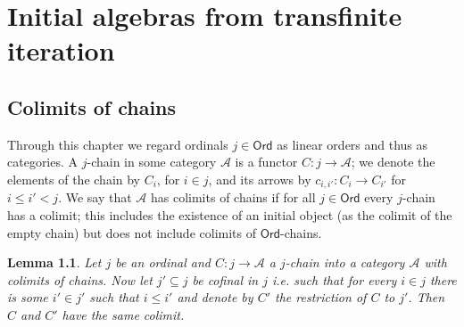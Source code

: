 \documentclass[letterpaper, 11pt, oneside]{memoir}
\theoremstyle{myteo}
\newtheorem{lemma}[theorem]{Lemma}
\numberwithin{equation}{section}
\newcommand{\marginnote}[1]{\marginpar{\footnotesize #1}}
\newcommand{\Ord}{\textsf{Ord}}
\newcommand{\A}{\mathscr{A}}
\begin{document}
\chapter{Initial algebras from transfinite iteration}
\label{ch:algebras-transfinite-iteration}
\newpage

\section{Colimits of chains}
\label{sec:colimits_of_chains}

Through this chapter we regard ordinals \(j \in \Ord\) as linear orders and thus as categories.
A \(j\)-chain in some category \(\A\) is a functor \(C : j \to \A \)\marginnote{\(j\)-chain}; we denote the elements of the chain by \(C_i\), for \(i \in j\), and its arrows by \(c_{i,i'} : C_i \to C_{i'}\) for \(i \leq i' < j\).
We say that \(\A\) has colimits of chains if for all \(j \in \Ord\) every \(j\)-chain has a colimit; this includes the existence of an initial object (as the colimit of the empty chain) but does not include colimits of \(\Ord\)-chains.

\begin{lemma}
  \label{lemma:final_functors}
  Let \(j\) be an ordinal and \(C : j \to \A\) a \(j\)-chain into a category \(\A\) with colimits of chains.
  Now let \(j' \subseteq j\) be cofinal in \(j\) i.e. such that for every \(i \in j\) there is some \(i' \in j'\) such that \(i \leq i'\) and denote by \(C'\) the restriction of \(C\) to \(j'\).
  Then \(C\) and \(C'\) have the same colimit.
\end{lemma}
\end{document}
